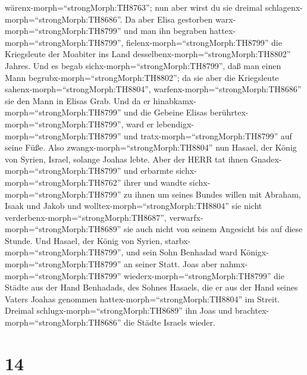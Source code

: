 wärenx-morph=``strongMorph:TH8763''; nun aber wirst du sie dreimal
schlagenx-morph=``strongMorph:TH8686''.  Da aber Elisa
gestorben warx-morph=``strongMorph:TH8799'' und man ihn begraben
hattex-morph=``strongMorph:TH8799'',
fielenx-morph=``strongMorph:TH8799'' die Kriegsleute der Moabiter ins
Land desselbenx-morph=``strongMorph:TH8802'' Jahres.  Und
es begab sichx-morph=``strongMorph:TH8799'', daß man einen Mann
begrubx-morph=``strongMorph:TH8802''; da sie aber die Kriegsleute
sahenx-morph=``strongMorph:TH8804'',
warfenx-morph=``strongMorph:TH8686'' sie den Mann in Elisas Grab. Und da
er hinabkamx-morph=``strongMorph:TH8799'' und die Gebeine Elisas
berührtex-morph=``strongMorph:TH8799'', ward er
lebendigx-morph=``strongMorph:TH8799'' und
tratx-morph=``strongMorph:TH8799'' auf seine Füße.  Also
zwangx-morph=``strongMorph:TH8804'' nun Hasael, der König von Syrien,
Israel, solange Joahas lebte.  Aber der HERR tat ihnen
Gnadex-morph=``strongMorph:TH8799'' und erbarmte
sichx-morph=``strongMorph:TH8762'' ihrer und wandte
sichx-morph=``strongMorph:TH8799'' zu ihnen um seines Bundes willen mit
Abraham, Isaak und Jakob und wolltex-morph=``strongMorph:TH8804'' sie
nicht verderbenx-morph=``strongMorph:TH8687'',
verwarfx-morph=``strongMorph:TH8689'' sie auch nicht von seinem
Angesicht bis auf diese Stunde.  Und Hasael, der König von
Syrien, starbx-morph=``strongMorph:TH8799'', und sein Sohn Benhadad ward
Königx-morph=``strongMorph:TH8799'' an seiner Statt.  Joas
aber nahmx-morph=``strongMorph:TH8799''
wiederx-morph=``strongMorph:TH8799'' die Städte aus der Hand Benhadads,
des Sohnes Hasaels, die er aus der Hand seines Vaters Joahas genommen
hattex-morph=``strongMorph:TH8804'' im Streit. Dreimal
schlugx-morph=``strongMorph:TH8689'' ihn Joas und
brachtex-morph=``strongMorph:TH8686'' die Städte Israels wieder.

\hypertarget{section-13}{%
\section{14}\label{section-13}}

